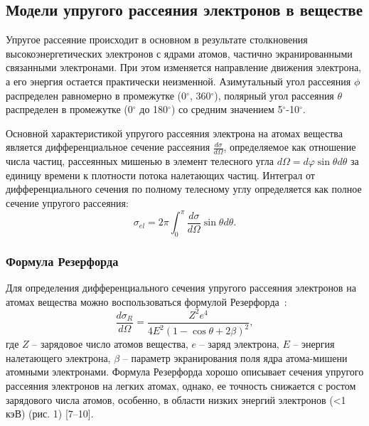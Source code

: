 \subsection{Модели упругого рассеяния электронов в веществе}
Упругое рассеяние происходит в основном в результате столкновения высокоэнергетических электронов с ядрами атомов, частично экранированными связанными электронами. При этом изменяется направление движения электрона, а его энергия остается практически неизменной. Азимутальный угол рассеяния $\phi$ распределен равномерно в промежутке (0$^\circ$, 360$^\circ$), полярный угол рассеяния $\theta$ распределен в промежутке (0$^\circ$ до 180$^\circ$) со средним значением 5$^\circ$-10$^\circ$.

Основной характеристикой упругого рассеяния электрона на атомах вещества является дифференциальное сечение рассеяния $\frac{d \sigma}{d \Omega}$, определяемое как отношение числа частиц, рассеянных мишенью в элемент телесного угла $d \Omega = d \varphi \sin \theta d \theta$ за единицу времени к плотности потока налетающих частиц. Интеграл от дифференциального сечения по полному телесному углу определяется как полное сечение упругого рассеяния:
\begin{equation} \label{eq:models_1}
	\sigma_{el}=2 \pi \int_0^\pi \frac{d \sigma}{d \Omega} \sin \theta d \theta.
\end{equation}

\subsubsection{Формула Резерфорда}
Для определения дифференциального сечения упругого рассеяния электронов на атомах вещества можно воспользоваться формулой Резерфорда~\cite{Dapor_large_book}:
\begin{equation} \label{eq:models_3}
	\frac{d \sigma_R}{d \Omega}=\frac{Z^2 e^4}{4 E^2(1-\cos \theta+2 \beta)^2},
\end{equation}
где $Z$ -- зарядовое число атомов вещества, $e$ -- заряд электрона, $E$ -- энергия налетающего электрона, $\beta$ -- параметр экранирования поля ядра атома-мишени атомными электронами. Формула Резерфорда хорошо описывает сечения упругого рассеяния электронов на легких атомах, однако, ее точность снижается с ростом зарядового числа атомов, особенно, в области низких энергий электронов (<1 кэВ) (рис. 1) [7–10].

